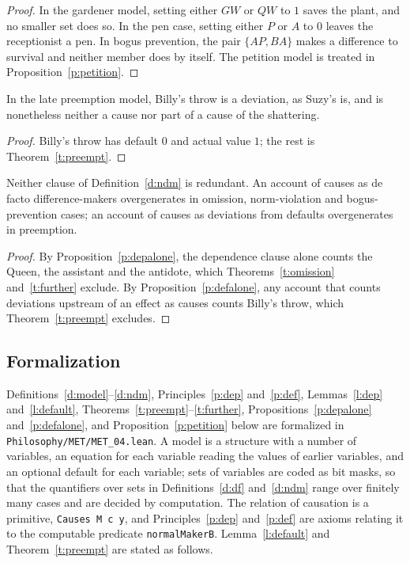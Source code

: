 \documentclass{situationist-preprint}
\begin{document}
\begin{proof}
In the gardener model, setting either $\mathit{GW}$ or $\mathit{QW}$ to $1$ saves the plant, and no smaller set does so. In the pen case, setting either $P$ or $A$ to $0$ leaves the receptionist a pen. In bogus prevention, the pair $\{\mathit{AP}, \mathit{BA}\}$ makes a difference to survival and neither member does by itself. The petition model is treated in Proposition~\ref{p:petition}.
\end{proof}

\begin{proposition}\label{p:defalone}
In the late preemption model, Billy's throw is a deviation, as Suzy's is, and is nonetheless neither a cause nor part of a cause of the shattering.
\end{proposition}

\begin{proof}
Billy's throw has default $0$ and actual value $1$; the rest is Theorem~\ref{t:preempt}.
\end{proof}

\begin{corollary}\label{c:both}
Neither clause of Definition~\ref{d:ndm} is redundant. An account of causes as de facto difference-makers overgenerates in omission, norm-violation and bogus-prevention cases; an account of causes as deviations from defaults overgenerates in preemption.
\end{corollary}

\begin{proof}
By Proposition~\ref{p:depalone}, the dependence clause alone counts the Queen, the assistant and the antidote, which Theorems~\ref{t:omission} and~\ref{t:further} exclude. By Proposition~\ref{p:defalone}, any account that counts deviations upstream of an effect as causes counts Billy's throw, which Theorem~\ref{t:preempt} excludes.
\end{proof}

\subsection{Formalization}\label{s:formal}

Definitions~\ref{d:model}--\ref{d:ndm}, Principles~\ref{p:dep} and~\ref{p:def}, Lemmas~\ref{l:dep} and~\ref{l:default}, Theorems~\ref{t:preempt}--\ref{t:further}, Propositions~\ref{p:depalone} and~\ref{p:defalone}, and Proposition~\ref{p:petition} below are formalized in \nolinkurl{Philosophy/MET/MET_04.lean}. A model is a structure with a number of variables, an equation for each variable reading the values of earlier variables, and an optional default for each variable; sets of variables are coded as bit masks, so that the quantifiers over sets in Definitions~\ref{d:df} and~\ref{d:ndm} range over finitely many cases and are decided by computation. The relation of causation is a primitive, \texttt{Causes M c y}, and Principles~\ref{p:dep} and~\ref{p:def} are axioms relating it to the computable predicate \texttt{normalMakerB}. Lemma~\ref{l:default} and Theorem~\ref{t:preempt} are stated as follows.
\end{document}
